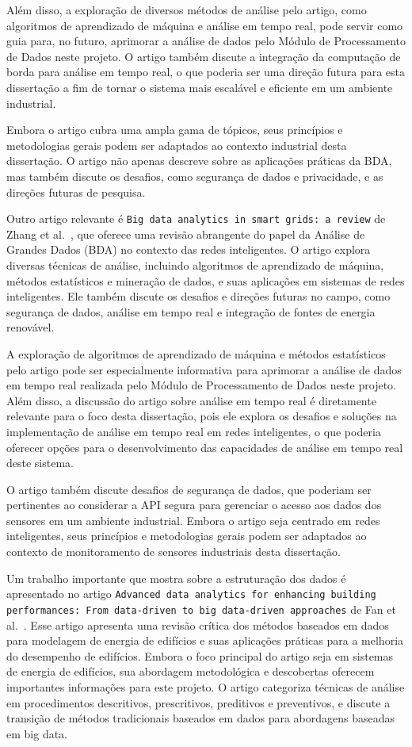 Além disso, a exploração de diversos métodos de análise pelo artigo, como algoritmos de aprendizado de máquina e análise em tempo real, pode servir como guia para, no futuro, aprimorar a análise de dados pelo Módulo de Processamento de Dados neste projeto. O artigo também discute a integração da computação de borda para análise em tempo real, o que poderia ser uma direção futura para esta dissertação a fim de tornar o sistema mais escalável e eficiente em um ambiente industrial.

Embora o artigo cubra uma ampla gama de tópicos, seus princípios e metodologias gerais podem ser adaptados ao contexto industrial desta dissertação. O artigo não apenas descreve sobre as aplicações práticas da BDA, mas também discute os desafios, como segurança de dados e privacidade, e as direções futuras de pesquisa.


Outro artigo relevante é \texttt{Big data analytics in smart grids: a review} de Zhang et al.~\cite{Zhang2018}, que oferece uma revisão abrangente do papel da Análise de Grandes Dados (BDA) no contexto das redes inteligentes. O artigo explora diversas técnicas de análise, incluindo algoritmos de aprendizado de máquina, métodos estatísticos e mineração de dados, e suas aplicações em sistemas de redes inteligentes. Ele também discute os desafios e direções futuras no campo, como segurança de dados, análise em tempo real e integração de fontes de energia renovável.

A exploração de algoritmos de aprendizado de máquina e métodos estatísticos pelo artigo pode ser especialmente informativa para aprimorar a análise de dados em tempo real realizada pelo Módulo de Processamento de Dados neste projeto. Além disso, a discussão do artigo sobre análise em tempo real é diretamente relevante para o foco desta dissertação, pois ele explora os desafios e soluções na implementação de análise em tempo real em redes inteligentes, o que poderia oferecer opções para o desenvolvimento das capacidades de análise em tempo real deste sistema.

O artigo também discute desafios de segurança de dados, que poderiam ser pertinentes ao considerar a API segura para gerenciar o acesso aos dados dos sensores em um ambiente industrial. Embora o artigo seja centrado em redes inteligentes, seus princípios e metodologias gerais podem ser adaptados ao contexto de monitoramento de sensores industriais desta dissertação.

Um trabalho importante que mostra sobre a estruturação dos dados é apresentado no artigo \texttt{Advanced data analytics for enhancing building performances: From data-driven to big data-driven approaches} de Fan et al.~\cite{Fan2021}. Esse artigo apresenta uma revisão crítica dos métodos baseados em dados para modelagem de energia de edifícios e suas aplicações práticas para a melhoria do desempenho de edifícios. Embora o foco principal do artigo seja em sistemas de energia de edifícios, sua abordagem metodológica e descobertas oferecem importantes informações para este projeto. O artigo categoriza técnicas de análise em procedimentos descritivos, prescritivos, preditivos e preventivos, e discute a transição de métodos tradicionais baseados em dados para abordagens baseadas em big data.

